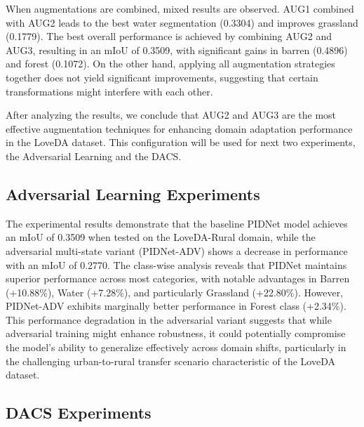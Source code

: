 \documentclass[10pt,twocolumn,letterpaper]{article}
\begin{document}
When augmentations are combined, mixed results are observed. AUG1 combined with AUG2 leads to the best water segmentation (0.3304) and improves grassland (0.1779). The best overall performance is achieved by combining AUG2 and AUG3, resulting in an mIoU of 0.3509, with significant gains in barren (0.4896) and forest (0.1072). On the other hand, applying all augmentation strategies together does not yield significant improvements, suggesting that certain transformations might interfere with each other. 

After analyzing the results, we conclude that AUG2 and AUG3 are the most effective augmentation techniques for enhancing domain adaptation performance in the LoveDA dataset. This configuration will be used for next two experiments, the Adversarial Learning and the DACS.

\subsection{Adversarial Learning Experiments}
The experimental results demonstrate that the baseline PIDNet model achieves an mIoU of 0.3509 when tested on the LoveDA-Rural domain, while the adversarial multi-state variant (PIDNet-ADV) shows a decrease in performance with an mIoU of 0.2770. The class-wise analysis reveals that PIDNet maintains superior performance across most categories, with notable advantages in Barren (+10.88\%), Water (+7.28\%), and particularly Grassland (+22.80\%). However, PIDNet-ADV exhibits marginally better performance in Forest class (+2.34\%). This performance degradation in the adversarial variant suggests that while adversarial training might enhance robustness, it could potentially compromise the model's ability to generalize effectively across domain shifts, particularly in the challenging urban-to-rural transfer scenario characteristic of the LoveDA dataset.

\subsection{DACS Experiments}
\end{document}
